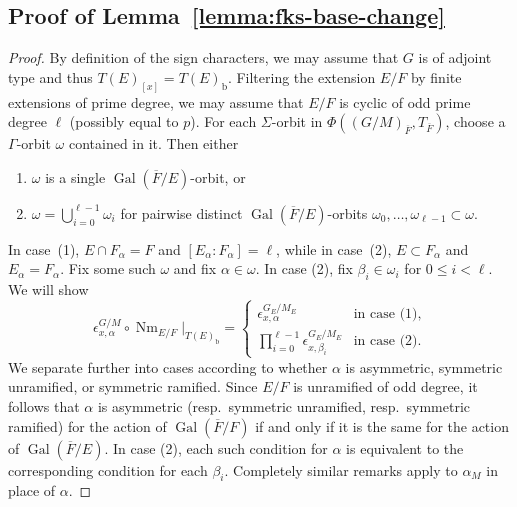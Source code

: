 \documentclass[reqno]{amsart}
\numberwithin{equation}{subsection}
\newcommand{\Gal}{\operatorname{Gal}}
\newcommand{\ol}[1]{\overline{#1}}
\DeclareMathOperator{\Nm}{Nm}
\theoremstyle{remark}
\numberwithin{equation}{subsection}
\numberwithin{figure}{subsection}
\begin{document}
\subsection{Proof of Lemma~\ref{lemma:fks-base-change}}\label{app:fks-base-change-proof}

\begin{proof}
By definition of the sign characters, we may assume that $G$ is of adjoint type and thus $T(E)_{[x]} = T(E)_{\mathrm b}$.
Filtering the extension $E/F$ by finite extensions of prime degree, we may assume that $E/F$ is cyclic of odd prime degree $\ell$ (possibly equal to $p$). For each $\Sigma$-orbit in $\Phi((G/M)_{\ol F},T_{\ol F})$, choose a $\Gamma$-orbit $\omega$ contained in it.  Then either
\begin{enumerate}
    \item $\omega$ is a single $\Gal(\ol F/E)$-orbit, or
    \item $\omega = \bigcup_{i=0}^{\ell-1} \omega_i$ for pairwise distinct $\Gal(\ol F/E)$-orbits $\omega_0, \dots, \omega_{\ell-1} \subset \omega$.
\end{enumerate}
In case~(1), $E\cap F_\alpha=F$ and $[E_\alpha:F_\alpha]=\ell$, while in case~(2), $E\subset F_\alpha$ and $E_\alpha=F_\alpha$.
Fix some such $\omega$ and fix $\alpha \in \omega$. In case (2), fix $\beta_i \in \omega_i$ for $0 \leq i < \ell$. We will show
\begin{equation}\label{eqn:FKS-bc-root}
\epsilon_{x,\alpha}^{G/M} \circ \Nm_{E/F}|_{T(E)_{\mathrm{b}}} = \begin{cases}
    \epsilon_{x,\alpha}^{G_E/M_E} &\text{in case (1)},\\
\prod_{i=0}^{\ell-1} \epsilon_{x,\beta_i}^{G_E/M_E} &\text{in case (2).}
\end{cases}
\end{equation}
We separate further into cases according to whether $\alpha$ is asymmetric, symmetric unramified, or symmetric ramified. Since $E/F$ is unramified of odd degree, it follows that $\alpha$ is asymmetric (resp.\ symmetric unramified, resp.\ symmetric ramified) for the action of $\Gal(\ol F/F)$ if and only if it is the same for the action of $\Gal(\ol F/E)$. In case (2), each such condition for $\alpha$ is equivalent to the corresponding condition for each $\beta_i$. Completely similar remarks apply to $\alpha_M$ in place of $\alpha$.


\end{proof}
\end{document}
